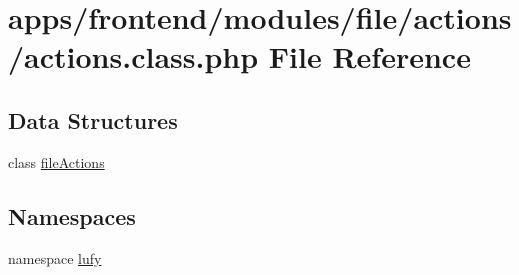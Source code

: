\hypertarget{frontend_2modules_2file_2actions_2actions_8class_8php}{\section{apps/frontend/modules/file/actions/actions.class.\-php File Reference}
\label{frontend_2modules_2file_2actions_2actions_8class_8php}
}
\subsection*{Data Structures}
\begin{DoxyCompactItemize}
\item 
class \hyperlink{classfile_actions}{file\-Actions}
\end{DoxyCompactItemize}
\subsection*{Namespaces}
\begin{DoxyCompactItemize}
\item 
namespace \hyperlink{namespacelufy}{lufy}
\end{DoxyCompactItemize}
